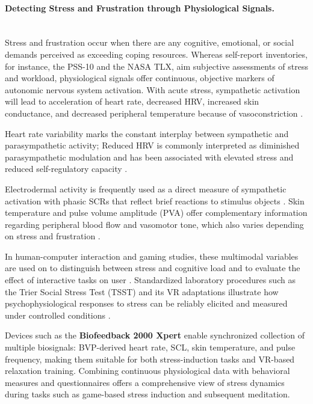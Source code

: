 \paragraph{Detecting Stress and Frustration through Physiological Signals.}\mbox{}\\
Stress and frustration occur when there are any cognitive, emotional, or social demands perceived as exceeding coping resources. Whereas self-report inventories, for instance, the PSS-10 and the NASA TLX, aim subjective assessments of stress and workload, physiological signals offer continuous, objective markers of autonomic nervous system activation. With acute stress, sympathetic activation will lead to acceleration of heart rate, decreased HRV, increased skin conductance, and decreased
peripheral temperature because of vasoconstriction \cite{healey2005stress,mccraty2001hrv,boucsein2012eda}.

Heart rate variability marks the constant interplay between sympathetic and parasympathetic activity; Reduced HRV is commonly interpreted as diminished parasympathetic modulation and has been associated with elevated stress and reduced self-regulatory capacity \cite{mccraty2001hrv}. 

Electrodermal activity is frequently used as a direct measure of sympathetic activation with phasic SCRs that reflect brief reactions to stimulus objects \cite{boucsein2012eda}. Skin temperature and pulse volume amplitude (PVA) offer complementary information regarding peripheral blood flow and vasomotor tone, which also varies depending on stress and frustration \cite{setz2010frustration}.

In human-computer interaction and gaming studies, these multimodal variables are used on
to distinguish between stress and cognitive load and to evaluate the effect of interactive tasks on user \cite{fairclough2009physio,aliyari2018gamestress,porter2019GamesStress}. Standardized laboratory procedures such as the Trier Social Stress Test (TSST) and its VR adaptations illustrate how psychophysiological responses to stress can be reliably elicited and measured under controlled conditions \cite{Kirschbaum1993TSST,Allen2014TSSTReview,Zimmer2019VR_TSST,OpenTSSTVR2020,rodrigues2021IMVEST}. 

Devices such as the \textbf{Biofeedback 2000 Xpert} enable synchronized collection of multiple biosignals: BVP-derived heart rate, SCL, skin temperature, and pulse frequency, making them suitable for both stress-induction tasks and VR-based relaxation training. Combining continuous physiological data with behavioral measures and questionnaires offers a comprehensive view of stress dynamics during tasks such as game-based stress induction and subsequent meditation.



